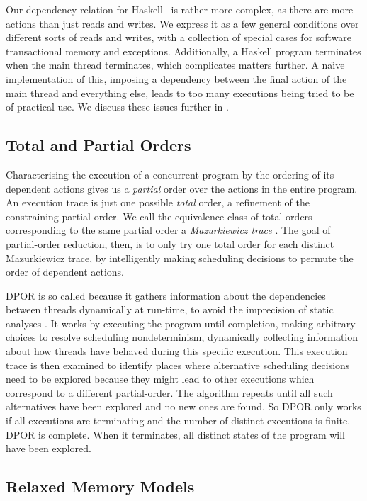 Our dependency relation for Haskell~ is rather
more complex, as there are more actions than just reads and writes.
We express it as a few general conditions over different sorts of
reads and writes, with a collection of special cases for software
transactional memory and exceptions.  Additionally, a Haskell program
terminates when the main thread terminates, which complicates matters
further.  A na\"{\i}ve implementation of this, imposing a dependency
between the final action of the main thread and everything else, leads
to too many executions being tried to be of practical use.  We discuss
these issues further in .

\subsection{Total and Partial Orders}

Characterising the execution of a concurrent program by the ordering
of its dependent actions gives us a \emph{partial} order over the
actions in the entire program.  An execution trace is just one
possible \emph{total} order, a refinement of the constraining partial
order.  We call the equivalence class of total orders corresponding to
the same partial order a \emph{Mazurkiewicz
  trace} \parencite{mazurkiewicz1986}.  The goal of partial-order reduction,
then, is to only try one total order for each distinct Mazurkiewicz
trace, by intelligently making scheduling decisions to permute the
order of dependent actions.

DPOR is so called because it gathers information about the
dependencies between threads dynamically at run-time, to avoid the
imprecision of static analyses \parencite{flanagan2005}.  It works by
executing the program until completion, making arbitrary choices to
resolve scheduling nondeterminism, dynamically collecting information
about how threads have behaved during this specific execution.  This
execution trace is then examined to identify places where alternative
scheduling decisions need to be explored because they might lead to
other executions which correspond to a different partial-order.  The
algorithm repeats until all such alternatives have been explored and
no new ones are found.  So DPOR only works if all executions are
terminating and the number of distinct executions is finite.  DPOR is
complete.  When it terminates, all distinct states of the program will
have been explored.

\subsection{Relaxed Memory Models}

